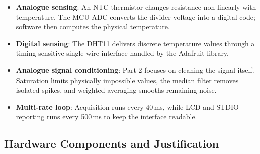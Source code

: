 \documentclass[12pt]{article}
\begin{document}
\begin{itemize}
    \item \textbf{Analogue sensing}: An NTC thermistor changes resistance non-linearly with temperature. The MCU ADC converts the divider voltage into a digital code; software then computes the physical temperature.
    \item \textbf{Digital sensing}: The DHT11 delivers discrete temperature values through a timing-sensitive single-wire interface handled by the Adafruit library.
    \item \textbf{Analogue signal conditioning}: Part 2 focuses on cleaning the signal itself. Saturation limits physically impossible values, the median filter removes isolated spikes, and weighted averaging smooths remaining noise.
    \item \textbf{Multi-rate loop}: Acquisition runs every 40\,ms, while LCD and STDIO reporting runs every 500\,ms to keep the interface readable.
\end{itemize}

\subsection{Hardware Components and Justification}
\end{document}

